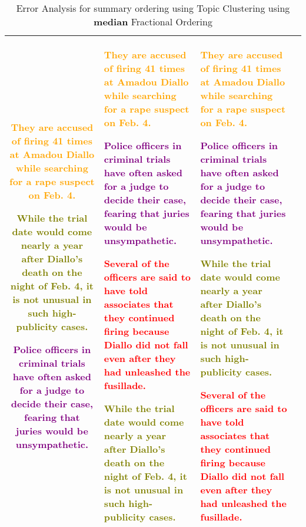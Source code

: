 \begin{table*}[h]
\begin{tabular}{|c|p{4.3cm}|p{4.3cm}|p{4.3cm}|}
        \textcolor{orange}{They are accused of firing 41 times at Amadou Diallo while searching for a rape suspect on Feb. 4.}
        
        \textcolor{olive}{While the trial date would come nearly a year after Diallo's death on the night of Feb. 4, it is not unusual in such high-publicity cases.}
        
        \textcolor{purple}{Police officers in criminal trials have often asked for a judge to decide their case, fearing that juries would be unsympathetic.}
        
        & 
         \textcolor{orange}{They are accused of firing 41 times at Amadou Diallo while searching for a rape suspect on Feb. 4.}

         \textcolor{purple}{Police officers in criminal trials have often asked for a judge to decide their case, fearing that juries would be unsympathetic.}

        \textcolor{red}{Several of the officers are said to have told associates that they continued firing because Diallo did not fall even after they had unleashed the fusillade.}

        \textcolor{olive}{While the trial date would come nearly a year after Diallo's death on the night of Feb. 4, it is not unusual in such high-publicity cases.}
        & 
        \textcolor{orange}{They are accused of firing 41 times at Amadou Diallo while searching for a rape suspect on Feb. 4.}

        \textcolor{purple}{Police officers in criminal trials have often asked for a judge to decide their case, fearing that juries would be unsympathetic.}

        \textcolor{olive}{While the trial date would come nearly a year after Diallo's death on the night of Feb. 4, it is not unusual in such high-publicity cases.}

        \textcolor{red}{Several of the officers are said to have told associates that they continued firing because Diallo did not fall even after they had unleashed the fusillade.} \\
        \hline
    \end{tabular}
    \caption{Error Analysis for summary ordering using Topic Clustering using \textbf{median} Fractional Ordering}
    \label{clustering_median}
\end{table*}